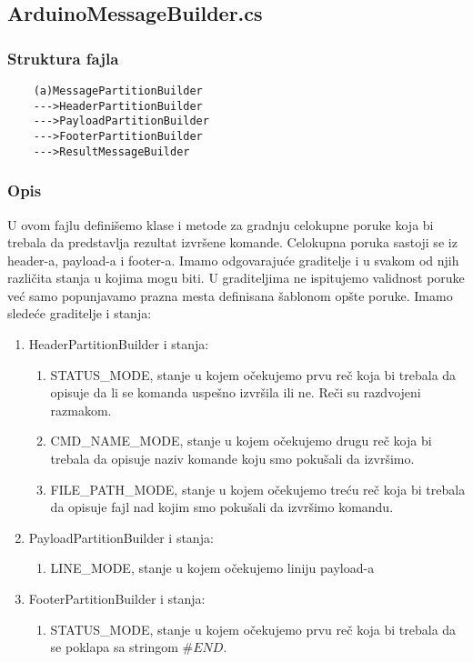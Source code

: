 \documentclass[a4paper]{extarticle}
\begin{document}
	\subsection{ArduinoMessageBuilder.cs}
	\label{a4}
		\subsubsection*{Struktura fajla}
	\begin{verbatim}
	(a)MessagePartitionBuilder
	--->HeaderPartitionBuilder
	--->PayloadPartitionBuilder
	--->FooterPartitionBuilder
	--->ResultMessageBuilder
	\end{verbatim}
	
	\subsubsection*{Opis}
	U ovom fajlu definišemo klase i metode za gradnju celokupne poruke koja bi trebala da predstavlja rezultat izvršene komande. Celokupna poruka  sastoji se iz header-a, payload-a i footer-a. Imamo odgovarajuće graditelje i u svakom od njih različita stanja u kojima mogu biti. U graditeljima ne ispitujemo validnost poruke već samo popunjavamo prazna mesta definisana šablonom opšte poruke. Imamo sledeće graditelje i stanja:
	\begin{enumerate}
		\item HeaderPartitionBuilder i stanja:
		\begin{enumerate}
			\item STATUS\_MODE, stanje u kojem očekujemo prvu reč koja bi trebala da opisuje da li se komanda uspešno izvršila ili ne. Reči su razdvojeni razmakom.
			\item CMD\_NAME\_MODE, stanje u kojem očekujemo drugu reč koja bi trebala da opisuje naziv komande koju smo pokušali da izvršimo.
			\item FILE\_PATH\_MODE, stanje u kojem očekujemo treću reč koja bi trebala da opisuje fajl nad kojim smo pokušali da izvršimo komandu.
		\end{enumerate}
		\item PayloadPartitionBuilder i stanja:
		\begin{enumerate}
		\item LINE\_MODE, stanje u kojem očekujemo liniju payload-a
		\end{enumerate}
		\item FooterPartitionBuilder i stanja:
		\begin{enumerate}
			\item STATUS\_MODE, stanje u kojem očekujemo prvu reč koja bi trebala da se poklapa sa stringom $\#END$.
		\end{enumerate}
	\end{enumerate}
\end{document}

